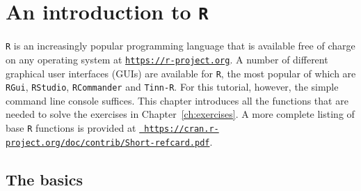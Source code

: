 \chapter{An introduction to \texttt{R}}
\label{ch:R}

\texttt{R} is an increasingly popular programming language that is
available free of charge on any operating system at
\href{https://r-project.org}{\tt https://r-project.org}. A number of
different graphical user interfaces (GUIs) are available for
\texttt{R}, the most popular of which are \texttt{RGui},
\texttt{RStudio}, \texttt{RCommander} and \texttt{Tinn-R}.  For this
tutorial, however, the simple command line console suffices. This
chapter introduces all the functions that are needed to solve the
exercises in Chapter~\ref{ch:exercises}. A more complete listing of
base \texttt{R} functions is provided at
\href{https://cran.r-project.org/doc/contrib/Short-refcard.pdf} {\tt
  https://cran.r-project.org/doc/contrib/Short-refcard.pdf}.

\section{The basics}
\label{sec:R-basics}

